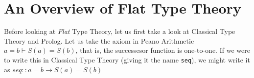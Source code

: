 \section{An Overview of Flat Type Theory}

Before looking at \emph{Flat} Type Theory, let us first take a look at Classical Type Theory and Prolog.
Let us take the axiom in Peano Arithmetic $a = b \vdash S(a) = S(b)$, that is, the successesor function is one-to-one.
If we were to write this in Classical Type Theory (giving it the name  \verb|seq|), we might write it as $seq :: a = b \to S(a) = S(b)$ 